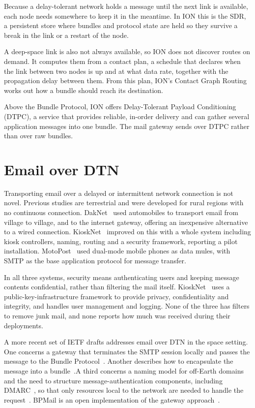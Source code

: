 Because a delay-tolerant network holds a message until the next link is available, each node needs somewhere to keep it in the meantime. In ION this is the SDR, a persistent store where bundles and protocol state are held so they survive a break in the link or a restart of the node.

A deep-space link is also not always available, so ION does not discover routes on demand. It computes them from a contact plan, a schedule that declares when the link between two nodes is up and at what data rate, together with the propagation delay between them. From this plan, ION's Contact Graph Routing works out how a bundle should reach its destination.

Above the Bundle Protocol, ION offers Delay-Tolerant Payload Conditioning (DTPC), a service that provides reliable, in-order delivery and can gather several application messages into one bundle. The mail gateway sends over DTPC rather than over raw bundles.

\section{Email over DTN}

Transporting email over a delayed or intermittent network connection is not novel. Previous studies are terrestrial and were developed for rural regions with no continuous connection. DakNet~\cite{daknet} used automobiles to transport email from village to village, and to the internet gateway, offering an inexpensive alternative to a wired connection. KioskNet~\cite{kiosknet} improved on this with a whole system including kiosk controllers, naming, routing and a security framework, reporting a pilot installation. MotoPost~\cite{motopost} used dual-mode mobile phones as data mules, with SMTP as the base application protocol for message transfer.

In all three systems, security means authenticating users and keeping message contents confidential, rather than filtering the mail itself. KioskNet~\cite{kiosknet} uses a public-key-infrastructure framework to provide privacy, confidentiality and integrity, and handles user management and logging. None of the three has filters to remove junk mail, and none reports how much was received during their deployments.


A more recent set of IETF drafts addresses email over DTN in the space setting. One concerns a gateway that terminates the SMTP session locally and passes the message to the Bundle Protocol~\cite{johnson-dtn-interplanetary-smtp-01}. Another describes how to encapsulate the message into a bundle~\cite{blanchet-dtn-email-over-bp-06}.A third concerns a naming model for off-Earth domains and the need to structure message-authentication components, including DMARC~\cite{rfc7489}, so that only resources local to the network are needed to handle the request~\cite{johnson-dtn-interplanetary-dns-04}. BPMail is an open implementation of the gateway approach~\cite{bpmail}.

